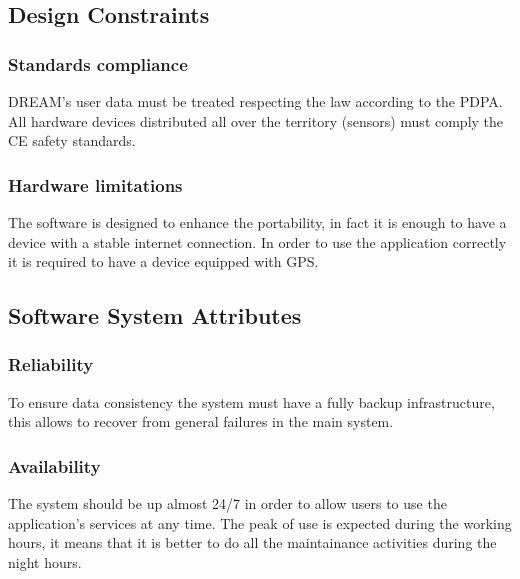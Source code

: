 \documentclass[table, 12pt]{article}
\begin{document}
\subsection{Design Constraints}

\subsubsection{Standards compliance}
DREAM's user data must be treated respecting the law according to the PDPA.
All hardware devices distributed all over the territory (sensors) must comply the CE safety standards.
\subsubsection{Hardware limitations}
The software is designed to enhance the portability, in fact it is enough to have a device with a stable internet connection.
In order to use the application correctly it is required to have a device equipped with GPS.

\subsection{Software System Attributes}
\subsubsection{Reliability}
To ensure data consistency the system must have a fully backup infrastructure, this allows to recover from general failures in the main system.

\subsubsection{Availability}
The system should be up almost 24/7 in order to allow users to use the application's services at any time.
The peak of use is expected during the working hours, it means that it is better to do all the maintainance activities during the night hours.
\end{document}
